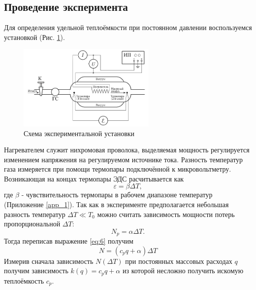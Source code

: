 \documentclass[12pt]{article}
\begin{document}
\subsection{Проведение эксперимента}
Для определения удельной теплоёмкости при постоянном давлении 
воспользуемся установкой (Рис. \ref{fig:scheme}). 
\begin{figure}
    \centering
    \includegraphics[width=0.6\textwidth]{scheme.png}
    \caption{Схема экспериментальной установки}
    \label{fig:scheme}
\end{figure}
Нагревателем служит нихромовая проволока, выделяемая мощность регулируется изменением 
напряжения на регулируемом источнике тока. Разность температур газа измеряется при помощи термопары 
подключённой к микровольтметру. Возникающая на концах термопары ЭДС расчитывается как 
\begin{equation}
    \varepsilon = \beta \Delta T,
    \label{eq:7}
\end{equation}
где $\beta$ - чувствительность термопары в рабочем диапазоне температур (Приложение \ref{app_1}). 
Так как в эксперименте предполагается небольшая разность температур $\Delta T \ll T_0$ можно считать 
зависимость мощности потерь пропорциональной $\Delta T$:
\begin{equation}
    N_p = \alpha \Delta T.
    \label{eq:7}
\end{equation}
Тогда переписав выражение \ref{eq:6} получим 
\begin{equation}
    N = (c_p q + \alpha ) \Delta T
    \label{eq:8}
\end{equation}
Измерив сначала зависимость $N(\Delta T)$ при постоянных массовых расходах $q$ 
получим зависимость $k(q) = c_p q + \alpha$ из которой несложно получить искомую теплоёмкость $c_p$.    
\end{document}
